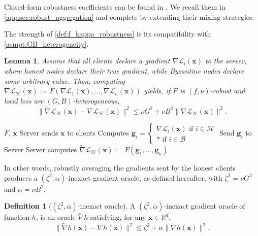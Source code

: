 \documentclass{article}
\def\vg{{\bm{g}}}
\def\vx{{\bm{x}}}
\newcommand{\R}{\mathbb{R}}
\newcommand{\cB}{\mathcal{B}}
\newcommand{\cH}{\mathcal{H}}
\newcommand{\cL}{\mathcal{L}}
\theoremstyle{plain}
\newtheorem{lemma}[theorem]{Lemma}
\theoremstyle{definition}
\newtheorem{definition}[theorem]{Definition}
\theoremstyle{remark}
\begin{document}
Closed-form robustness coefficients can be found in \citet{allouah2023fixing}. 
We recall them in \cref{app:sec:robust_aggregation} and complete by extending their mixing strategies. 



The strength of \cref{def:f_kappa_robustness} is  its compatibility with \cref{asmpt:GB_heterogeneity}. 
\begin{lemma}
\label{lemma:Byz_to_Inexact_Gradients}
    Assume that all clients declare a gradient $\nabla \cL_i(\vx)$ to the server, where honest nodes declare their true gradient, while Byzantine nodes declare some arbitrary value. Then, computing $\tilde{\nabla}\cL_{\cH}(\vx) := F(\nabla\cL_1(\vx),\ldots, \nabla \cL_n(\vx))$ yields, if $F$ is $(f,\nu)$-robust and local loss are $(G,B)$-heterogeneous,
\begin{equation}
    \|\tilde{\nabla}\cL_{\cH}(\vx) - \nabla \cL_{\cH}(\vx)\|^2 \le \nu G^2 + \nu B^2 \|\nabla \cL_{\cH}(\vx)\|^2.
\end{equation}
\end{lemma}

\begin{algorithm}[t]
  \caption{Inexact Oracles Sampler}
  \label{alg:reduction}
  \begin{algorithmic}
     $F$, $\vx$
    \STATE Server sends $\vx$ to clients
    \STATE Computes $
        \vg_i = \begin{cases}
            \nabla \cL_i(\vx) \text{ if } i\in \cH\\
            * \text{ if } i \in \cB
        \end{cases}
    $
    \STATE Send $\vg_i$ to Server
    \ENDFOR
    \STATE Server computes $\tilde \nabla \cL_{\cH}(\vx) := F(\vg_1,\ldots, \vg_n)$
  \end{algorithmic}
\end{algorithm}


In other words, robustly averaging the gradients sent by the honest clients produces a $(\zeta^2,\alpha)$-inexact gradient oracle, as defined hereafter, with $\zeta^2 = \nu G^2$ and $\alpha = \nu B^2$. 
\begin{definition}[$(\zeta^2,\alpha)$-inexact oracle]
\label{def:inexact_oracle}
    A $(\zeta^2,\alpha)$-inexact gradient oracle of function $h$, is an oracle $\tilde \nabla h$ satisfying, for any $\vx \in \R^d$,
    \[
    \|\tilde \nabla h(\vx) - \nabla h(\vx)\|^2 \le \zeta^2 + \alpha \|\nabla h(\vx)\|^2.
    \]
\end{definition}
\end{document}
